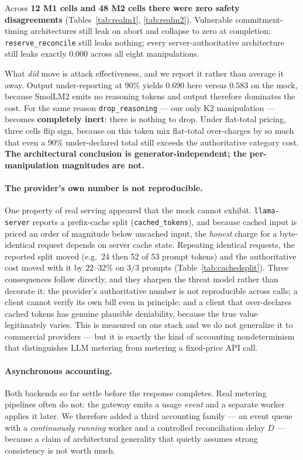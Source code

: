 \documentclass[11pt]{article}
\begin{document}
Across \textbf{12 M1 cells and 48 M2 cells there were zero safety disagreements}
(Tables~\ref{tab:realm1}, \ref{tab:realm2}). Vulnerable commitment-timing architectures
still leak on abort and collapse to zero at completion; \texttt{reserve\_reconcile} still
leaks nothing; every server-authoritative architecture still leaks exactly $0.000$ across
all eight manipulations.

What \emph{did} move is attack effectiveness, and we report it rather than average it
away. Output under-reporting at $90\%$ yields $0.690$ here versus $0.583$ on the mock,
because SmolLM2 emits no reasoning tokens and output therefore dominates the cost. For the
same reason \texttt{drop\_reasoning} --- our only K2 manipulation --- becomes
\textbf{completely inert}: there is nothing to drop. Under flat-total pricing, three cells
flip sign, because on this token mix flat-total over-charges by so much that even a $90\%$
under-declared total still exceeds the authoritative category cost. \textbf{The
architectural conclusion is generator-independent; the per-manipulation magnitudes are
not.}

\paragraph{The provider's own number is not reproducible.} One property of real serving
appeared that the mock cannot exhibit. \texttt{llama-server} reports a prefix-cache split
(\texttt{cached\_tokens}), and because cached input is priced an order of magnitude below
uncached input, the \emph{honest} charge for a byte-identical request depends on server
cache state. Repeating identical requests, the reported split moved (e.g.\ 24 then 52 of
53 prompt tokens) and the authoritative cost moved with it by $22$--$32\%$ on $3/3$ prompts
(Table~\ref{tab:cachedsplit}). Three consequences follow directly, and they sharpen the
threat model rather than decorate it: the provider's authoritative number is not
reproducible across calls; a client cannot verify its own bill even in principle; and a
client that over-declares cached tokens has genuine plausible deniability, because the
true value legitimately varies. This is measured on one stack and we do not generalize it
to commercial providers --- but it is exactly the kind of accounting nondeterminism that
distinguishes LLM metering from metering a fixed-price API call.

\paragraph{Asynchronous accounting.} Both backends so far settle before the response
completes. Real metering pipelines often do not: the gateway emits a usage \emph{event} and
a separate worker applies it later. We therefore added a third accounting family --- an
event queue with a \emph{continuously running} worker and a controlled reconciliation delay
$D$ --- because a claim of architectural generality that quietly assumes strong consistency
is not worth much.
\end{document}
